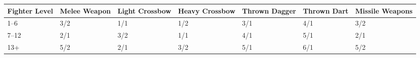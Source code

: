\noindent
\begin{minipage}{\columnwidth}

\label{weaponspecialization}
\noindent
\begin{tabular}{|p{}|p{}|p{}|p{}|p{}|p{}|p{}|}
\hline
Fighter Level	& Melee Weapon	& Light Crossbow	& Heavy Crossbow	& Thrown Dagger	& Thrown Dart	& Missile Weapons \\
\hline\hline
\rowcolor[gray]{.9}1--6		& 3/2	& 1/1	& 1/2	& 3/1	& 4/1	& 3/2 \\
7--12	& 2/1	& 3/2	& 1/1	& 4/1	& 5/1	& 2/1 \\
\rowcolor[gray]{.9}13+		& 5/2	& 2/1	& 3/2	& 5/1	& 6/1	& 5/2 \\
\hline
\end{tabular}

\end{minipage}


